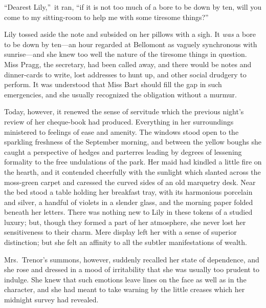 \documentclass[12pt,a4paper]{book}
\begin{document}
``Dearest Lily,''\ it ran, ``if it is not too much of a bore to be
down by ten, will you come to my sitting-room to help me with
some tiresome things?''





Lily tossed aside the note and subsided on her pillows with a
sigh. It \textit{was} a bore to be down by ten---an hour regarded at
Bellomont as vaguely synchronous with sunrise---and she knew too
well the nature of the tiresome things in question. Miss Pragg,
the secretary, had been called away, and there would be notes and
dinner-cards to write, lost addresses to hunt up, and other
social drudgery to perform. It was understood that Miss Bart
should fill the gap in such emergencies, and she usually
recognized the obligation without a murmur.





Today, however, it renewed the sense of servitude which the
previous night's review of her cheque-book had produced. 
Everything in her surroundings ministered to feelings of ease and
amenity. The windows stood open to the sparkling freshness of the
September morning, and between the yellow boughs she caught a
perspective of hedges and parterres leading by degrees of
lessening formality to the free undulations of the park. Her maid
had kindled a little fire on the hearth, and it contended
cheerfully with the sunlight which slanted across the moss-green
carpet and caressed the curved sides of an old marquetry desk. 
Near the bed stood a table holding her breakfast tray, with its
harmonious porcelain and silver, a handful of violets in a
slender glass, and the morning paper folded beneath her letters. 
There was nothing new to Lily in these tokens of a studied
luxury; but, though they formed a part of her atmosphere, she
never lost her sensitiveness to their charm. Mere display left
her with a sense of superior distinction; but she felt an
affinity to all the subtler manifestations of wealth.





Mrs.\ Trenor's summons, however, suddenly recalled her state of
dependence, and she rose and dressed in a mood of irritability
that she was usually too prudent to indulge. She knew that such
emotions leave lines on the face as well as in the
character, and she had meant to take warning by the little
creases which her midnight survey had revealed.
\end{document}
